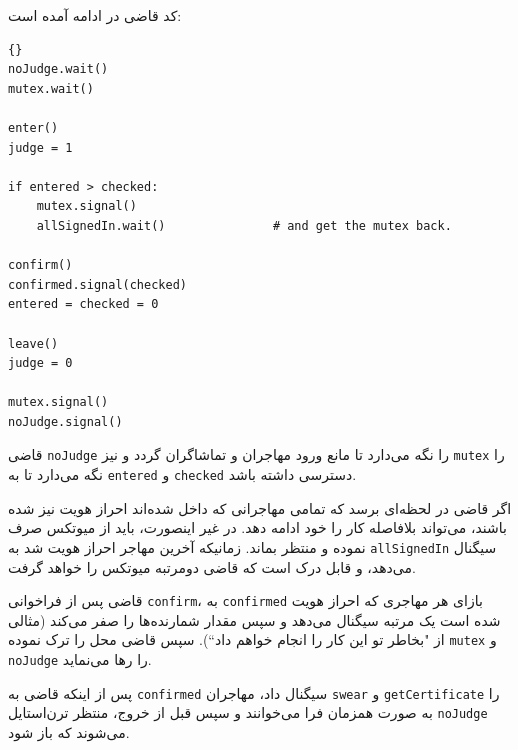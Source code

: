 \documentclass{book}
\begin{document}
    کد قاضی در ادامه آمده است: 

\begin{latin}
\begin{lstlisting}[title=\rl{راهنمایی مساله تالار \lr{Faneuil} (فاضی)}]{}
noJudge.wait()
mutex.wait()

enter()
judge = 1

if entered > checked:
    mutex.signal()
    allSignedIn.wait()               # and get the mutex back.

confirm()
confirmed.signal(checked)
entered = checked = 0

leave()
judge = 0

mutex.signal()
noJudge.signal()
\end{lstlisting}
\end{latin}

    قاضی {\tt noJudge} را نگه می‌دارد تا مانع ورود مهاجران و تماشاگران گردد و نیز {\tt mutex} را نگه می‌دارد تا به {\tt entered} و  {\tt checked}
    دسترسی داشته باشد. 

    اگر قاضی در لحظه‌ای برسد که تمامی مهاجرانی که داخل شده‌اند احراز هویت نیز شده باشند، می‌تواند بلافاصله کار را  خود ادامه دهد. 
    در غیر اینصورت، باید از میوتکس صرف نموده و منتظر بماند. زمانیکه آخرین مهاجر احراز هویت شد به  {\tt allSignedIn} سیگنال می‌دهد، 
    و قابل درک است که قاضی دومرتبه میوتکس را خواهد گرفت. 
    

    قاضی پس از فراخوانی {\tt confirm}، به  {\tt confirmed} بازای هر مهاجری که احراز هویت شده است  یک مرتبه سیگنال می‌دهد و سپس 
    مقدار شمارنده‌ها را صفر می‌کند (مثالی از "بخاطر تو این کار را انجام خواهم داد``).
    سپس قاضی محل را ترک نموده {\tt mutex} و {\tt noJudge}  را رها می‌نماید. 

    پس از اینکه قاضی به {\tt confirmed} سیگنال داد، مهاجران {\tt swear} و {\tt getCertificate} را به صورت همزمان فرا می‌خوانند و سپس 
    قبل از خروج، منتظر ترن‌استایل {\tt noJudge} می‌شوند که باز شود. 
\end{document}
